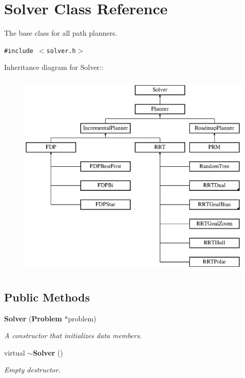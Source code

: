 \section{Solver  Class Reference}
\label{class_Solver}
The base class for all path planners. 


{\tt \#include $<$solver.h$>$}

Inheritance diagram for Solver::\begin{figure}[H]
\begin{center}
\leavevmode
\includegraphics[height=10cm]{class_Solver}
\end{center}
\end{figure}
\subsection*{Public Methods}
\begin{CompactItemize}
\item 
{\bf Solver} ({\bf Problem} $\ast$problem)
\begin{CompactList}\small\item\em A constructor that initializes data members.\item\end{CompactList}\item 
virtual {\bf $\sim$Solver} ()
\begin{CompactList}\small\item\em Empty destructor.\item\end{CompactList}\end{CompactItemize}
